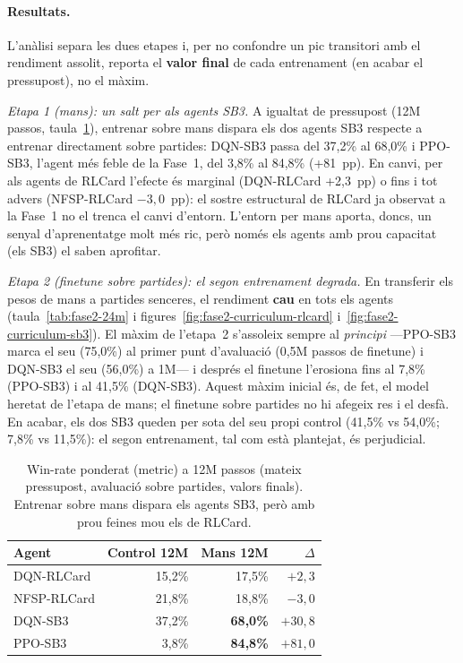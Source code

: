 \paragraph{Resultats.} L'anàlisi separa les dues etapes i, per no confondre un pic
transitori amb el rendiment assolit, reporta el \textbf{valor final} de cada entrenament
(en acabar el pressupost), no el màxim.

\emph{Etapa 1 (mans): un salt per als agents \ac{SB3}.} A igualtat de pressupost (12M
passos, taula~\ref{tab:fase2-12m}), entrenar sobre mans dispara els dos agents \ac{SB3}
respecte a entrenar directament sobre partides: DQN-SB3 passa del 37{,}2\% al 68{,}0\% i
PPO-SB3, l'agent més feble de la Fase~1, del 3{,}8\% al 84{,}8\% (+81~pp). En canvi, per als
agents de RLCard l'efecte és marginal (DQN-RLCard +2{,}3~pp) o fins i tot advers
(NFSP-RLCard $-3{,}0$~pp): el sostre estructural de RLCard ja observat a la Fase~1 no el
trenca el canvi d'entorn. L'entorn per mans aporta, doncs, un senyal d'aprenentatge molt
més ric, però només els agents amb prou capacitat (els \ac{SB3}) el saben aprofitar.

\emph{Etapa 2 (finetune sobre partides): el segon entrenament degrada.} En transferir els
pesos de mans a partides senceres, el rendiment \textbf{cau} en tots els agents
(taula~\ref{tab:fase2-24m} i figures~\ref{fig:fase2-curriculum-rlcard}
i~\ref{fig:fase2-curriculum-sb3}). El màxim de l'etapa~2 s'assoleix sempre al
\emph{principi} —PPO-SB3 marca el seu (75{,}0\%) al primer punt d'avaluació (0{,}5M passos
de finetune) i DQN-SB3 el seu (56{,}0\%) a 1M— i després el finetune l'erosiona fins al
7{,}8\% (PPO-SB3) i al 41{,}5\% (DQN-SB3). Aquest màxim inicial és, de fet, el model heretat
de l'etapa de mans; el finetune sobre partides no hi afegeix res i el desfà. En acabar, els
dos \ac{SB3} queden per sota del seu propi control (41{,}5\% vs 54{,}0\%; 7{,}8\% vs
11{,}5\%): el segon entrenament, tal com està plantejat, és perjudicial.

\begin{table}[H]
  \centering
  \begin{tabular}{lrrr}
    \toprule
    Agent & Control 12M & Mans 12M & $\Delta$ \\
    \midrule
    DQN-RLCard  & 15{,}2\% & 17{,}5\% & $+2{,}3$ \\
    NFSP-RLCard & 21{,}8\% & 18{,}8\% & $-3{,}0$ \\
    DQN-SB3     & 37{,}2\% & \textbf{68{,}0\%} & $+30{,}8$ \\
    PPO-SB3     & 3{,}8\%  & \textbf{84{,}8\%} & $+81{,}0$ \\
    \bottomrule
  \end{tabular}
  \caption{Win-rate ponderat (\(\text{metric}\)) a 12M passos (mateix pressupost, avaluació
           sobre partides, valors finals). Entrenar sobre mans dispara els agents \ac{SB3},
           però amb prou feines mou els de RLCard.}
  \label{tab:fase2-12m}
\end{table}

